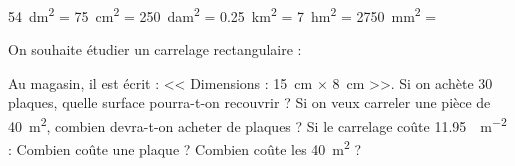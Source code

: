 \documentclass[../Cours.tex]{subfiles}
\begin{document}
\begin{questions}
\begin{center}
        \end{center}
        
    \exercice 
        \question \qty{54}{dm\squared} = 
        \question \qty{75}{cm\squared} = 
        \question \qty{250}{dam\squared} = 
        \question \qty{0,25}{km\squared} = 
        \question \qty{7}{hm\squared} = 
        \question \qty{2750}{mm\squared} = 

    \exercice On souhaite étudier un carrelage rectangulaire :
    \begin{center}
    \end{center}

    Au magasin, il est écrit : << Dimensions : \qty{15}{\centi\metre} $\times$ \qty{8}{\centi\metre} >>.
    \question Si on achète 30 plaques, quelle surface pourra-t-on recouvrir ?
    \question Si on veux carreler une pièce de \qty{40}{\metre\squared}, combien devra-t-on acheter de plaques ?
    \question Si le carrelage coûte \qty{11.95}{\EURO\per\metre\squared} :
        \subquestion Combien coûte une plaque ?
        \subquestion Combien coûte les \qty{40}{\metre\squared} ?
\end{questions}
\end{document}
